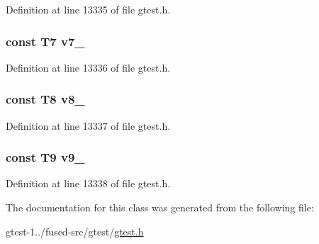 \-Definition at line 13335 of file gtest.\-h.

\hypertarget{classtesting_1_1internal_1_1ValueArray50_a4063f0b7a528133d018ee488ba44a9a3}{
\subsubsection[{v7\-\_\-}]{\setlength{\rightskip}{0pt plus 5cm}const \-T7 {\bf v7\-\_\-}}}\label{df/d05/classtesting_1_1internal_1_1ValueArray50_a4063f0b7a528133d018ee488ba44a9a3}


\-Definition at line 13336 of file gtest.\-h.

\hypertarget{classtesting_1_1internal_1_1ValueArray50_a596bc5260b2474271d1f6910ff6f665d}{
\subsubsection[{v8\-\_\-}]{\setlength{\rightskip}{0pt plus 5cm}const \-T8 {\bf v8\-\_\-}}}\label{df/d05/classtesting_1_1internal_1_1ValueArray50_a596bc5260b2474271d1f6910ff6f665d}


\-Definition at line 13337 of file gtest.\-h.

\hypertarget{classtesting_1_1internal_1_1ValueArray50_a6356e16cf54a9dfac8525f20242af31e}{
\subsubsection[{v9\-\_\-}]{\setlength{\rightskip}{0pt plus 5cm}const \-T9 {\bf v9\-\_\-}}}\label{df/d05/classtesting_1_1internal_1_1ValueArray50_a6356e16cf54a9dfac8525f20242af31e}


\-Definition at line 13338 of file gtest.\-h.



\-The documentation for this class was generated from the following file\-:\begin{DoxyCompactItemize}
\item 
gtest-\/1../fused-\/src/gtest/\hyperlink{fused-src_2gtest_2gtest_8h}{gtest.\-h}\end{DoxyCompactItemize}

